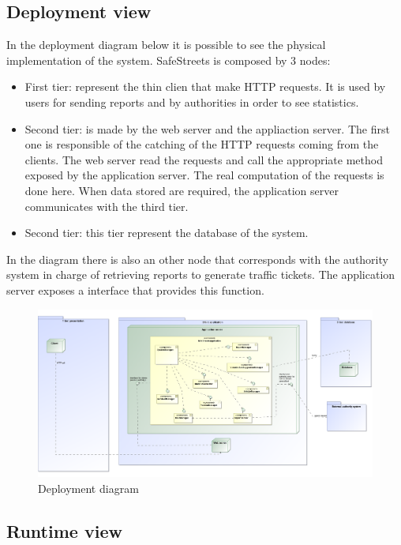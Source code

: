 \subsection{Deployment view}
In the deployment diagram below it is possible to see the physical implementation of the system.
SafeStreets is composed by 3 nodes:
\begin{itemize}
	\item 
	First tier: represent the thin clien that make HTTP requests. It is used by users for sending reports and by authorities in order to see statistics.
	\item 
	Second tier: is made by the web server and the appliaction server. The first one is responsible of the catching of the HTTP requests coming from the clients. The web server read the requests and call the appropriate method exposed by the application server. The real computation of the requests is done here.
	When data stored are required, the application server communicates with the third tier.
	\item 
	Second tier: this tier represent the database of the system. 
\end{itemize} 

In the diagram there is also an other node that corresponds with the authority system in charge of retrieving reports to generate traffic tickets. The application server exposes a interface that provides this function. 

\begin{figure}[H]
	\centering
	\includegraphics[width=1.12\linewidth]{Images/Deployment.png}
	\caption{Deployment diagram}
\end{figure}

\subsection{Runtime view}


